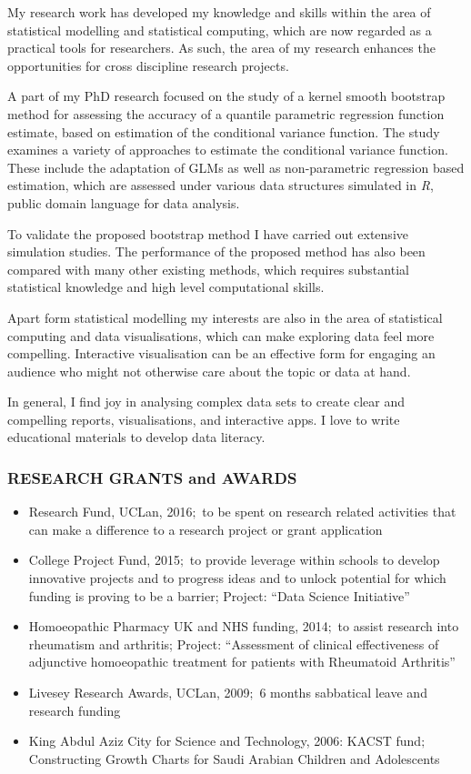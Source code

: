 \documentclass[
]{article}
\providecommand{\tightlist}{%
  \setlength{\itemsep}{0pt}\setlength{\parskip}{0pt}}
\begin{document}
My research work has developed my knowledge and skills within the area
of statistical modelling and statistical computing, which are now
regarded as a practical tools for researchers. As such, the area of my
research enhances the opportunities for cross discipline research
projects.

A part of my PhD research focused on the study of a kernel smooth
bootstrap method for assessing the accuracy of a quantile parametric
regression function estimate, based on estimation of the conditional
variance function. The study examines a variety of approaches to
estimate the conditional variance function. These include the adaptation
of GLMs as well as non-parametric regression based estimation, which are
assessed under various data structures simulated in \emph{R}, public
domain language for data analysis.

To validate the proposed bootstrap method I have carried out extensive
simulation studies. The performance of the proposed method has also been
compared with many other existing methods, which requires substantial
statistical knowledge and high level computational skills.

Apart form statistical modelling my interests are also in the area of
statistical computing and data visualisations, which can make exploring
data feel more compelling. Interactive visualisation can be an effective
form for engaging an audience who might not otherwise care about the
topic or data at hand.

In general, I find joy in analysing complex data sets to create clear
and compelling reports, visualisations, and interactive apps. I love to
write educational materials to develop data literacy.

\hypertarget{research-grants-and-awards}{%
\subsubsection{RESEARCH GRANTS and
AWARDS}\label{research-grants-and-awards}}

\begin{itemize}
\tightlist
\item
  Research Fund, UCLan, 2016\(;\) to be spent on research related
  activities that can make a difference to a research project or grant
  application
\item
  College Project Fund, 2015\(;\) to provide leverage within schools to
  develop innovative projects and to progress ideas and to unlock
  potential for which funding is proving to be a barrier; Project:
  ``Data Science Initiative''
\item
  Homoeopathic Pharmacy UK and NHS funding, 2014\(;\) to assist research
  into rheumatism and arthritis; Project: ``Assessment of clinical
  effectiveness of adjunctive homoeopathic treatment for patients with
  Rheumatoid Arthritis''
\item
  Livesey Research Awards, UCLan, 2009\(;\) 6 months sabbatical leave
  and research funding
\item
  King Abdul Aziz City for Science and Technology, 2006: KACST fund\(;\)
  Constructing Growth Charts for Saudi Arabian Children and Adolescents
\end{itemize}
\end{document}
